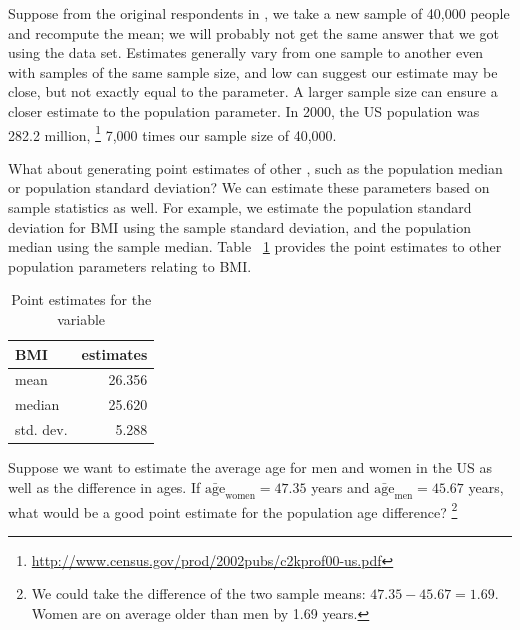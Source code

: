 Suppose from the original respondents in , we take a new sample of 40,000 people and recompute the mean; we will probably not get the same answer that we got using the  data set. Estimates generally vary from one sample to another even with samples of the same sample size, and low  can suggest our estimate may be close, but not exactly equal to the parameter. A larger sample size can ensure a closer estimate to the population parameter. In 2000, the US population was 282.2 million, \footnote{\url{http://www.census.gov/prod/2002pubs/c2kprof00-us.pdf}} 7,000 times our sample size of 40,000. 

What about generating point estimates of other , such as the population median or population standard deviation? We can estimate these parameters based on sample statistics as well. For example, we estimate the population standard deviation for BMI using the sample standard deviation, and the population median using the sample median. Table ~\ref{BMIEstimates} provides the point estimates to other population parameters relating to BMI.

\begin{table}[ht]
\centering
\begin{tabular}{lr}
  \hline
BMI & estimates \\ 
  \hline
mean & 26.356 \\ 
  median & 25.620 \\ 
  std. dev. & 5.288 \\ 
   \hline
\end{tabular}
\caption{Point estimates for the  variable} 
\label{BMIEstimates}
\end{table}

\begin{exercise} \label{pointEstimateOfDesiredWeights}
Suppose we want to estimate the average age for men and women in the US as well as the difference in ages. If $\bar{\mathrm{age}}_{\mathrm{women}} = 47.35 $ years and $\bar{\mathrm{age}} _ {\mathrm{men}} = 45.67 $ years, what would be a good point estimate for the population age difference? \footnote{We could take the difference of the two sample means: $47.35 - 45.67 =  1.69$. Women are on average older than men by 1.69 years.}
\end{exercise}

